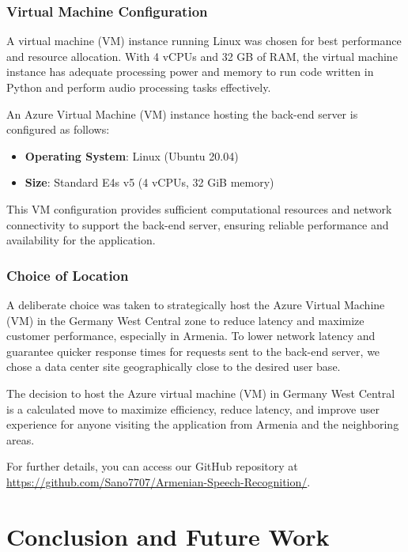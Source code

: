 \documentclass[conference]{IEEEtran}
\begin{document}
\subsubsection{Virtual Machine Configuration}

A virtual machine (VM) instance running Linux was chosen for best performance and resource allocation. With 4 vCPUs and 32 GB  of RAM, the virtual machine instance has adequate processing power and memory to run code written in Python and perform audio processing tasks effectively.

An Azure Virtual Machine (VM) instance hosting the back-end server is configured as follows:

\begin{itemize}
    \item \textbf{Operating System}: Linux (Ubuntu 20.04)
    \item \textbf{Size}: Standard E4s v5 (4 vCPUs, 32 GiB memory)
\end{itemize}

This VM configuration provides sufficient computational resources and network connectivity to support the back-end server, ensuring reliable performance and availability for the application.

\subsubsection{Choice of Location}

A deliberate choice was taken to strategically host the Azure Virtual Machine (VM) in the Germany West Central zone to reduce latency and maximize customer performance, especially in Armenia. To lower network latency and guarantee quicker response times for requests sent to the back-end server, we chose a data center site geographically close to the desired user base.

The decision to host the Azure virtual machine (VM) in Germany West Central is a calculated move to maximize efficiency, reduce latency, and improve user experience for anyone visiting the application from Armenia and the neighboring areas.

For further details, you can access our GitHub repository at \url{https://github.com/Sano7707/Armenian-Speech-Recognition/}.


\section{Conclusion and Future Work}
\end{document}
